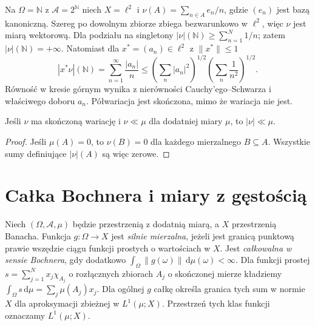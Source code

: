 \begin{przyklad}
\label{ex:semivariation-not-variation-30}
Na $\Omega=\mathbb N$ z $\mathcal A=2^{\mathbb N}$
niech $X=\ell^2$ i $\nu(A)=\sum_{n\in A}e_n/n$,
gdzie $(e_n)$ jest bazą kanoniczną. Szereg po dowolnym
zbiorze zbiega bezwarunkowo w $\ell^2$, więc $\nu$
jest miarą wektorową. Dla podziału na singletony
$|\nu|(\mathbb N)\ge\sum_{n=1}^{N}1/n$; zatem
$|\nu|(\mathbb N)=+\infty$.
Natomiast dla $x^*=(a_n)\in\ell^2$ z $\|x^*\|\le1$
\[
 |x^*\nu|(\mathbb N)=\sum_{n=1}^{\infty}\frac{|a_n|}{n}
 \le\left(\sum_n|a_n|^2\right)^{1/2}
 \left(\sum_n\frac1{n^2}\right)^{1/2}.
\]
Równość w kresie górnym wynika z nierówności
Cauchy'ego--Schwarza i właściwego doboru $a_n$.
Półwariacja jest skończona, mimo że wariacja nie jest.
\end{przyklad}

\begin{lemat}
\label{lem:vector-variation-ac-30}
Jeśli $\nu$ ma skończoną wariację i $\nu\ll\mu$
dla dodatniej miary $\mu$, to $|\nu|\ll\mu$.
\end{lemat}
\begin{proof}
Jeśli $\mu(A)=0$, to $\nu(B)=0$ dla każdego
mierzalnego $B\subseteq A$. Wszystkie sumy definiujące
$|\nu|(A)$ są więc zerowe.
\end{proof}

\section{Całka Bochnera i miary z gęstością}
\label{sec:bochner-30}
\begin{definicja}
\label{def:bochner-30}
Niech $(\Omega,\mathcal A,\mu)$ będzie przestrzenią
z dodatnią miarą, a $X$ przestrzenią Banacha.
Funkcja $g:\Omega\to X$ jest \emph{silnie mierzalna},
jeżeli jest granicą punktową prawie wszędzie ciągu
funkcji prostych o wartościach w $X$.
Jest \emph{całkowalna w sensie Bochnera}, gdy dodatkowo
$\int_\Omega\|g(\omega)\|\,\mathrm d\mu(\omega)<\infty$.
Dla funkcji prostej $s=\sum_{j=1}^{N}x_j\chi_{A_j}$
o rozłącznych zbiorach $A_j$ o skończonej mierze
kładziemy $\int_\Omega s\,\mathrm d\mu=\sum_j\mu(A_j)x_j$.
Dla ogólnej $g$ całkę określa granica tych sum
w normie $X$ dla aproksymacji zbieżnej w
$L^1(\mu;X)$. Przestrzeń tych klas funkcji
oznaczamy $L^1(\mu;X)$.
\end{definicja}

